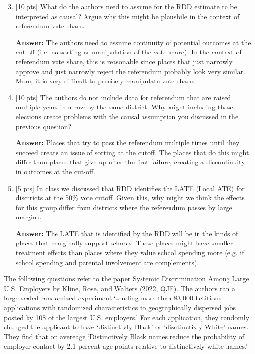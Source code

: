\documentclass[12pt]{article}
\newcommand{\answer}[1]{{\color{blue_winged_teal}\textbf{Answer:} #1}}
\newcommand{\pts}[1]{{\color{zinc500} [#1 pts]}}
\begin{document}
\begin{enumerate}
    \setcounter{enumi}{2}
  \item \pts{10} What do the authors need to assume for the RDD estimate to be
    interpreted as causal?
    Argue why this might be plausbile in the context of referendum vote share.

  \answer{
    The authors need to assume continuity of potential outcomes at the cut-off (i.e. no sorting or manipulation of the vote share). 
    In the context of referendum vote share, this is reasonable since places that just narrowly approve and just narrowly reject the referendum probably look very similar. 
    More, it is very difficult to precisely manipulate vote-share.
  }

  \item \pts{10} The authors do not include data for referendum that are
    raised multiple years in a row by the same district.
    Why might including those elections create problems with the
    causal assumption you discussed in the previous question?

  \answer{
    Places that try to pass the referendum multiple times until they succeed create an issue of sorting at the cutoff. 
    The places that do this might differ than places that give up after the first failure, creating a discontinuity in outcomes at the cut-off.
  }

  \item \pts{5} In class we discussed that RDD identifies the LATE (Local
    ATE) for disctricts at the 50\% vote cutoff.
    Given this, why might we think the effects for this group differ
    from districts where the referendum passes by large margins.

  \answer{
    The LATE that is identified by the RDD will be in the kinds of places that marginally support schools.
    These places might have smaller treatment effects than places where they value school spending more (e.g. if school spending and parental involvement are complements).
  }
\end{enumerate}

\newpage
\noindent
The following questions refer to the paper Systemic Discrimination
Among Large U.S. Employers by Kline, Rose, and Walters (2022, QJE).
The authors ran a large-scaled randomized experiment `sending more
than 83,000 fictitious applications with randomized characteristics
to geographically dispersed jobs posted by 108 of the largest U.S. employers.'
For each application, they randomly changed the applicant to have
`distinctivly Black' or `disctinctivly White' names.
They find that on avereage `Distinctively Black names reduce the
probability of employer contact by 2.1 percent-age points relative to
distinctively white names.'
\end{document}
